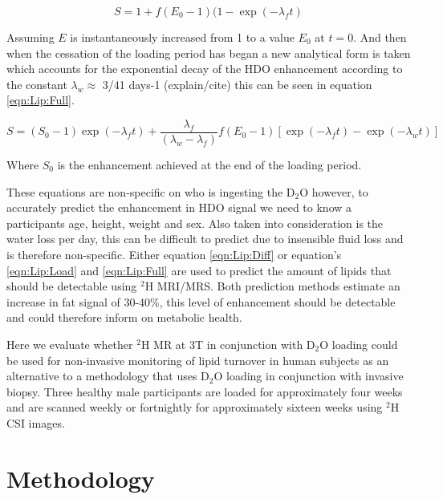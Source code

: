 \documentclass[class=article, crop=false]{standalone}
\begin{document}
\begin{equation}
    S = 1 + f(E_0 - 1)(1 - \exp(-\lambda_ft)
    \label{eqn:Lip:Load}
\end{equation}

Assuming $E$ is instantaneously increased from 1 to a value $E_0$ at $t=0$. And then when the cessation of the loading period has began a new analytical form is taken which accounts for the exponential decay of the HDO enhancement according to the constant $\lambda_w \approx$ 3/41 days-1 (explain/cite) this can be seen in equation \ref{eqn:Lip:Full}.

\begin{equation}
    S = (S_0 - 1)\exp(-\lambda_ft)+\frac{\lambda_f}{(\lambda_w - \lambda_f)}f(E_0 - 1)[\exp(-\lambda_ft)-\exp(-\lambda_wt)]
    \label{eqn:Lip:Full}
\end{equation}

Where $S_0$ is the enhancement achieved at the end of the loading period.

These equations are non-specific on who is ingesting the D$_2$O however, to accurately predict the enhancement in HDO signal we need to know a participants age, height, weight and sex\cite{Watson1980TotalMeasurements}. Also taken into consideration is the water loss per day, this can be difficult to predict due to insensible fluid loss and is therefore non-specific. Either equation \ref{eqn:Lip:Diff} or equation’s \ref{eqn:Lip:Load} and \ref{eqn:Lip:Full} are used to predict the amount of lipids that should be detectable using $^2$H MRI/MRS. Both prediction methods estimate an increase in fat signal of 30-40\%, this level of enhancement should be detectable and could therefore inform on metabolic health. 

Here we evaluate whether $^2$H MR at 3T in conjunction with D$_2$O loading could be used for non-invasive monitoring of lipid turnover in human subjects as an alternative to a methodology that uses D$_2$O loading in conjunction with invasive biopsy. Three healthy male participants are loaded for approximately four weeks and are scanned weekly or fortnightly for approximately sixteen weeks using $^2$H CSI images.

\section{Methodology}
\end{document}
